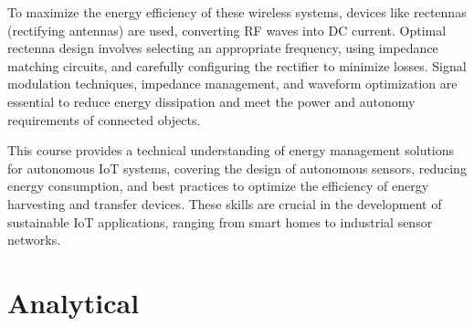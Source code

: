 To maximize the energy efficiency of these wireless systems, devices like rectennas (rectifying antennas) are used, converting RF waves into DC current. Optimal rectenna design involves selecting an appropriate frequency, using impedance matching circuits, and carefully configuring the rectifier to minimize losses. Signal modulation techniques, impedance management, and waveform optimization are essential to reduce energy dissipation and meet the power and autonomy requirements of connected objects.

This course provides a technical understanding of energy management solutions for autonomous IoT systems, covering the design of autonomous sensors, reducing energy consumption, and best practices to optimize the efficiency of energy harvesting and transfer devices. These skills are crucial in the development of sustainable IoT applications, ranging from smart homes to industrial sensor networks.


\section{Analytical}



